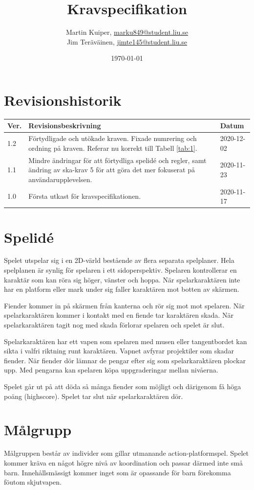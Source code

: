 \documentclass{TDP005mall}
\author{Martin Kuiper, \url{marku849@student.liu.se}\\
  Jim Teräväinen, \url{jimte145@student.liu.se}}
\title{Kravspecifikation}
\date{\today}
\begin{document}
\projectpage
\section{Revisionshistorik}
\begin{table}[!h]
\begin{tabularx}{\linewidth}{|l|X|l|}
\hline
Ver. & Revisionsbeskrivning & Datum \\\hline
1.2 & Förtydligade och utökade kraven. Fixade numrering och ordning på kraven. Referar nu korrekt till Tabell \ref{tab:1}. & 2020-12-02 \\\hline
1.1 & Mindre ändringar för att förtydliga spelidé och regler, samt ändring av ska-krav 5 för att göra det mer fokuserat på användarupplevelsen. & 2020-11-23 \\\hline
1.0 & Första utkast för kravspecifikationen. & 2020-11-17 \\\hline
\end{tabularx}
\end{table}


\section{Spelidé}
Spelet utspelar sig i en 2D-värld bestående av flera separata spelplaner. Hela spelplanen är synlig för spelaren i ett sidoperspektiv. Spelaren kontrollerar en karaktär som kan röra sig höger, vänster och hoppa. När spelarkaraktären inte har en platform eller mark under sig faller karaktären mot botten av skärmen.

Fiender kommer in på skärmen från kanterna och rör sig mot mot spelaren. När spelarkaraktären kommer i kontakt med en fiende tar karaktären skada. När spelarkaraktären tagit nog med skada förlorar spelaren och spelet är slut. 

Spelarkaraktären har ett vapen som spelaren med musen eller tangentbordet kan sikta i valfri riktning runt karaktären. Vapnet avfyrar projektiler som skadar fiender.
När fiender dör lämnar de pengar efter sig som spelarkaraktären plockar upp. Med pengarna kan spelaren köpa uppgraderingar mellan nivåerna. 

Spelet går ut på att döda så många fiender som möjligt och därigenom få höga poäng (highscore). Spelet tar slut när spelarkaraktären dör.


\section{Målgrupp}
Målgruppen består av individer som gillar utmanande action-platformspel. Spelet kommer kräva en något högre nivå av koordination och passar därmed inte små barn. Innehållsmässigt kommer inget som är opassande för barn förekomma föutom skjutvapen.
\end{document}
